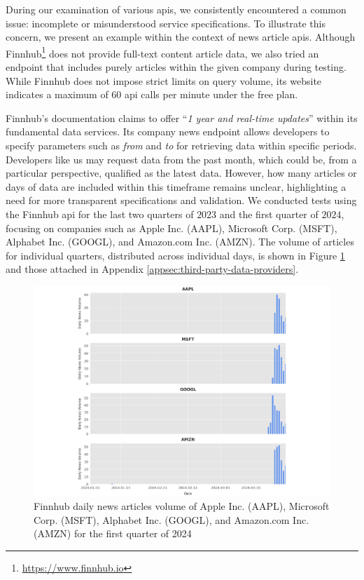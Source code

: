 During our examination of various \acrshort{api}s, we consistently encountered a common issue: incomplete or misunderstood service specifications. To illustrate this concern, we present an example within the context of news article \acrshort{api}s. Although Finnhub\footnote{\href{https://www.finnhub.io}{https://www.finnhub.io}} does not provide full-text content article data, we also tried an endpoint that includes purely articles within the given company during testing. While Finnhub does not impose strict limits on query volume, its website indicates a maximum of 60 \acrshort{api} calls per minute under the free plan.

Finnhub's documentation \parencite{finnhub_doc} claims to offer ``\textit{1 year and real-time updates}'' within its fundamental data services. Its company news endpoint allows developers to specify parameters such as \textit{from} and \textit{to} for retrieving data within specific periods. Developers like us may request data from the past month, which could be, from a particular perspective, qualified as the latest data. However, how many articles or days of data are included within this timeframe remains unclear, highlighting a need for more transparent specifications and validation. We conducted tests using the Finnhub \acrshort{api} for the last two quarters of $2023$ and the first quarter of $2024$, focusing on companies such as Apple Inc. (AAPL), Microsoft Corp. (MSFT), Alphabet Inc. (GOOGL), and Amazon.com Inc. (AMZN). The volume of articles for individual quarters, distributed across individual days, is shown in Figure \ref{fig:finnhub-q1-2024} and those attached in Appendix \ref{appsec:third-party-data-providers}.

\begin{figure}[htbp]
    \centering
    \includegraphics[width=\textwidth]{img/textual-data/q1-2024-a.pdf}
    \caption{Finnhub daily news articles volume of Apple Inc. (AAPL), Microsoft Corp. (MSFT), Alphabet Inc. (GOOGL), and Amazon.com Inc. (AMZN) for the first quarter of 2024}
    \label{fig:finnhub-q1-2024}
\end{figure}


